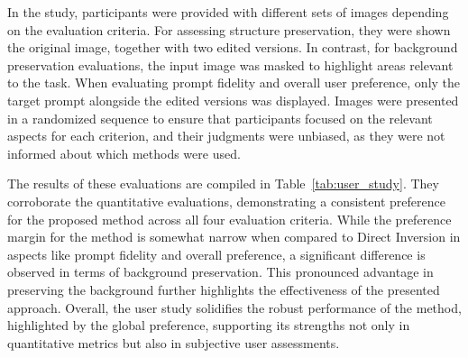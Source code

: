 In the study, participants were provided with different sets of images depending on the evaluation criteria. For assessing structure preservation, they were shown the original image, together with two edited versions. In contrast, for background preservation evaluations, the input image was masked to highlight areas relevant to the task. When evaluating prompt fidelity and overall user preference, only the target prompt alongside the edited versions was displayed. Images were presented in a randomized sequence to ensure that participants focused on the relevant aspects for each criterion, and their judgments were unbiased, as they were not informed about which methods were used. 




The results of these evaluations are compiled in Table~\ref{tab:user_study}. They corroborate {\modified{}the quantitative evaluations}, demonstrating a consistent preference for {\modified{}the proposed method} across all four evaluation criteria. While the preference margin for {\modified{}the method} is somewhat narrow when compared to Direct Inversion in aspects like prompt fidelity and overall preference, a significant difference is observed in terms of background preservation. This pronounced advantage in preserving the background further highlights the effectiveness of {\modified{}the presented approach}. Overall, the user study solidifies the robust performance of {\modified{}the method}, highlighted by the global preference, supporting its strengths not only in quantitative metrics but also in subjective user assessments.
